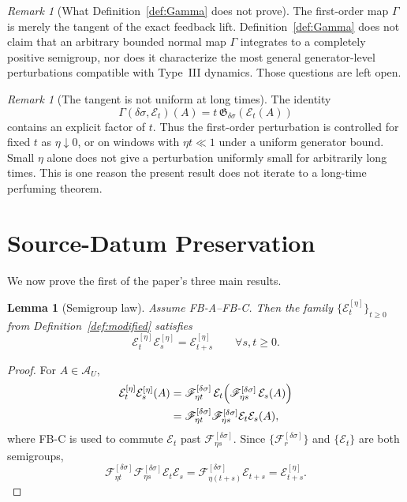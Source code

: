 \documentclass[12pt]{article}
\newtheorem{lemma}[theorem]{Lemma}
\theoremstyle{definition}
\theoremstyle{remark}
\newtheorem{remark}[theorem]{Remark}
\begin{document}
\begin{remark}[What Definition~\ref{def:Gamma} does not prove]
The first-order map \(\Gamma\) is merely the tangent of the exact
feedback lift. Definition~\ref{def:Gamma} does not claim that an
arbitrary bounded normal map \(\Gamma\) integrates to a completely
positive semigroup, nor does it characterize the most general
generator-level perturbations compatible with Type~III dynamics. Those
questions are left open.
\end{remark}

\begin{remark}[The tangent is not uniform at long times]
The identity
\[
\Gamma(\delta\sigma,\mathcal E_t)(A)
=t\,\mathfrak G_{\delta\sigma}(\mathcal E_t(A))
\]
contains an explicit factor of \(t\). Thus the first-order perturbation
is controlled for fixed \(t\) as \(\eta\downarrow0\), or on windows with
\(\eta t\ll1\) under a uniform generator bound. Small \(\eta\) alone
does not give a perturbation uniformly small for arbitrarily long times.
This is one reason the present result does not iterate to a long-time
perfuming theorem.
\end{remark}

\section{Source-Datum Preservation}\label{sec:preservation}

We now prove the first of the paper's three main results.

\begin{lemma}[Semigroup law]\label{lem:semigroup}
Assume FB-A--FB-C. Then the family
\(\{\mathcal E_t^{[\eta]}\}_{t\ge0}\) from
Definition~\ref{def:modified} satisfies
\[
\mathcal E_t^{[\eta]}\mathcal E_s^{[\eta]}
=
\mathcal E_{t+s}^{[\eta]}
\qquad
\forall s,t\ge0.
\]
\end{lemma}

\begin{proof}
For \(A\in\mathcal A_U\),
\begin{align*}
\mathcal E_t^{[\eta]}\mathcal E_s^{[\eta]}(A)
&=
\mathscr F_{\eta t}^{[\delta\sigma]}\,
\mathcal E_t
\Bigl(
\mathscr F_{\eta s}^{[\delta\sigma]}\,
\mathcal E_s(A)
\Bigr) \\
&=
\mathscr F_{\eta t}^{[\delta\sigma]}
\mathscr F_{\eta s}^{[\delta\sigma]}
\mathcal E_t\mathcal E_s(A),
\end{align*}
where FB-C is used to commute
\(\mathcal E_t\) past \(\mathscr F_{\eta s}^{[\delta\sigma]}\). Since
\(\{\mathscr F_r^{[\delta\sigma]}\}\) and \(\{\mathcal E_t\}\) are both
semigroups,
\[
\mathscr F_{\eta t}^{[\delta\sigma]}
\mathscr F_{\eta s}^{[\delta\sigma]}
\mathcal E_t\mathcal E_s
=
\mathscr F_{\eta(t+s)}^{[\delta\sigma]}
\mathcal E_{t+s}
=
\mathcal E_{t+s}^{[\eta]}.
\]
\end{proof}
\end{document}
